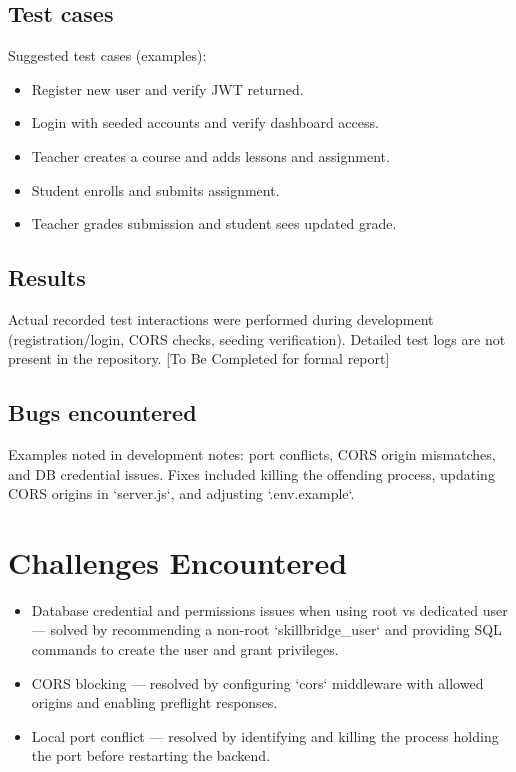 \documentclass[12pt,a4paper]{report}
\begin{document}
\section{Test cases}
Suggested test cases (examples):
\begin{itemize}
  \item Register new user and verify JWT returned.
  \item Login with seeded accounts and verify dashboard access.
  \item Teacher creates a course and adds lessons and assignment.
  \item Student enrolls and submits assignment.
  \item Teacher grades submission and student sees updated grade.
\end{itemize}

\section{Results}
Actual recorded test interactions were performed during development (registration/login, CORS checks, seeding verification). Detailed test logs are not present in the repository. [To Be Completed for formal report]

\section{Bugs encountered}
Examples noted in development notes: port conflicts, CORS origin mismatches, and DB credential issues. Fixes included killing the offending process, updating CORS origins in `server.js`, and adjusting `.env.example`.

\clearpage

\chapter{Challenges Encountered}
\begin{itemize}
  \item Database credential and permissions issues when using root vs dedicated user — solved by recommending a non-root `skillbridge_user` and providing SQL commands to create the user and grant privileges.
  \item CORS blocking — resolved by configuring `cors` middleware with allowed origins and enabling preflight responses.
  \item Local port conflict — resolved by identifying and killing the process holding the port before restarting the backend.
\end{itemize}
\end{document}
